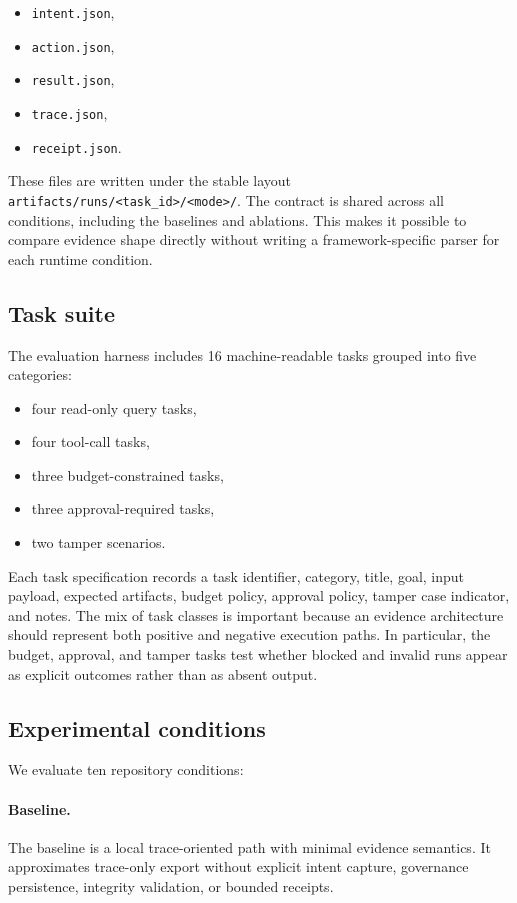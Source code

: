 \begin{itemize}
  \item \texttt{intent.json},
  \item \texttt{action.json},
  \item \texttt{result.json},
  \item \texttt{trace.json},
  \item \texttt{receipt.json}.
\end{itemize}

These files are written under the stable layout \texttt{artifacts/runs/<task\_id>/<mode>/}. The contract is shared across all conditions, including the baselines and ablations. This makes it possible to compare evidence shape directly without writing a framework-specific parser for each runtime condition.

\subsection{Task suite}

The evaluation harness includes 16 machine-readable tasks grouped into five categories:

\begin{itemize}
  \item four read-only query tasks,
  \item four tool-call tasks,
  \item three budget-constrained tasks,
  \item three approval-required tasks,
  \item two tamper scenarios.
\end{itemize}

Each task specification records a task identifier, category, title, goal, input payload, expected artifacts, budget policy, approval policy, tamper case indicator, and notes. The mix of task classes is important because an evidence architecture should represent both positive and negative execution paths. In particular, the budget, approval, and tamper tasks test whether blocked and invalid runs appear as explicit outcomes rather than as absent output.

\subsection{Experimental conditions}

We evaluate ten repository conditions:

\paragraph{Baseline.}
The baseline is a local trace-oriented path with minimal evidence semantics. It approximates trace-only export without explicit intent capture, governance persistence, integrity validation, or bounded receipts.

